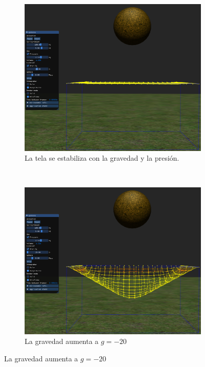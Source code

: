 \begin{figure}
 \centering
  \begin{subfigure}[b]{0.45\textwidth}
    \includegraphics[width=\textwidth]{img/04/gravity1}
    \caption{La tela se estabiliza con la gravedad y la presión.}
    \label{fig:testGEstable}
  \end{subfigure}
~
  \begin{subfigure}[b]{0.45\textwidth}
    \includegraphics[width=\textwidth]{img/04/gravity2}
    \caption{La gravedad aumenta a $g=-20$}
    \label{fig:testGAumenta}

\end{subfigure}
\end{figure}
